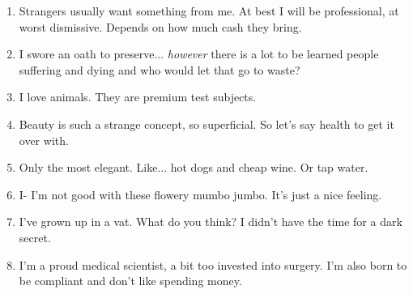 \begin{enumerate}
	\item Strangers usually want something from me. At best I will be professional, at worst dismissive. Depends on how much cash they bring.
	\item I swore an oath to preserve... \textit{however} there is a lot to be learned people suffering and dying and who would let that go to waste?
	\item I love animals. They are premium test subjects.
	\item Beauty is such a strange concept, so superficial. So let's say health to get it over with.
	\item Only the most elegant. Like... hot dogs and cheap wine. Or tap water.
	\item I- I'm not good with these flowery mumbo jumbo. It's just a nice feeling.
	\item I've grown up in a vat. What do you think? I didn't have the time for a dark secret.
	\item I'm a proud medical scientist, a bit too invested into surgery. I'm also born to be compliant and don't like spending money.
\end{enumerate}

